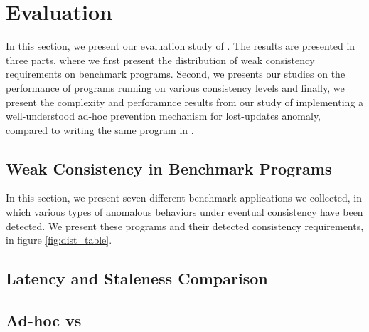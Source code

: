 \newpage
\section{Evaluation}
\label{sec:eval}
In this section, we present our evaluation study of \tool. The results
are presented in three parts, where we first present the distribution of
weak consistency requirements on benchmark programs. Second, we presents
our studies on the performance of programs running on various
consistency levels and finally, we present the complexity and
perforamnce results from our study of implementing 
a well-understood 
ad-hoc prevention mechanism for lost-updates anomaly, compared to writing
the same program in \tool. 
\subsection{Weak Consistency in Benchmark Programs}

In this section, we present seven different benchmark applications we collected,
in which various types of anomalous behaviors under eventual consistency have been
detected. We present these programs and their detected consistency
requirements, in figure \ref{fig:dist_table}.













\newpage
\subsection{Latency and Staleness Comparison}
\subsection{Ad-hoc vs \tool }
\newpage
